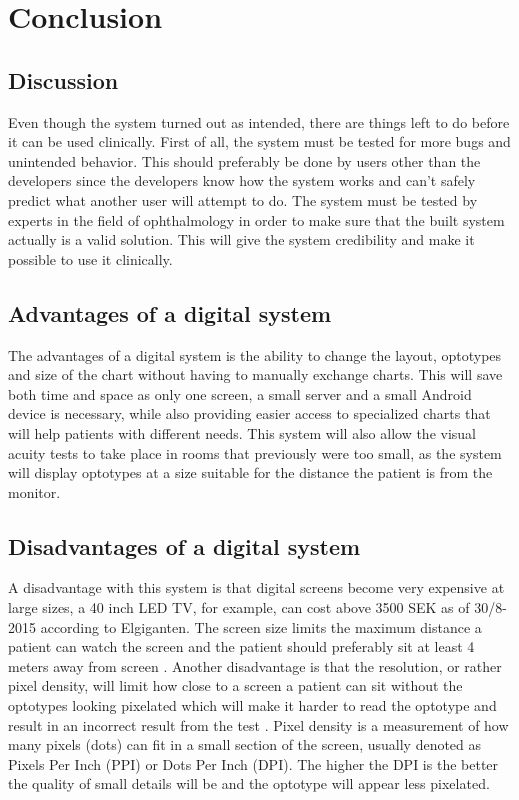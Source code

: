 \documentclass[12pt,a4paper,notitlepage]{report}
\begin{document}
\chapter{ Conclusion}

\section{Discussion}
Even though the system turned out as intended, there are things left to do before it can be used clinically. First of all, the system must be tested for more bugs and unintended behavior. This should preferably be done by users other than the developers since the developers know how the system works and can't safely predict what another user will attempt to do. The system must be tested by experts in the field of ophthalmology in order to make sure that the built system actually is a valid solution. This will give the system credibility and make it possible to use it clinically.

\section{Advantages of a digital system}
The advantages of a digital system is the ability to change the layout, optotypes and size of the chart without having to manually exchange charts. This will save both time and space as only one screen, a small server and a small Android device is necessary, while also providing easier access to specialized charts that will help patients with different needs. This system will also allow the visual acuity tests to take place in rooms that previously were too small, as the system will display optotypes at a size suitable for the distance the patient is from the monitor.

\section{Disadvantages of a digital system}
A disadvantage with this system is that digital screens become very expensive at large sizes, a 40 inch LED TV, for example, can cost above 3500 SEK as of 30/8-2015 according to Elgiganten. The screen size limits the maximum distance a patient can watch the screen and the patient should preferably sit at least 4 meters away from screen \cite{PGSoderbergOral}. Another disadvantage is that the resolution, or rather pixel density, will limit how close to a screen a patient can sit without the optotypes looking pixelated which will make it harder to read the optotype and result in an incorrect result from the test \cite{PGSoderbergOral}. Pixel density is a measurement of how many pixels (dots) can fit in a small section of the screen, usually denoted as Pixels Per Inch (PPI) or Dots Per Inch (DPI). The higher the DPI is the better the quality of small details will be and the optotype will appear less pixelated.
\end{document}
